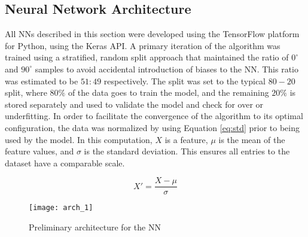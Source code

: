 \documentclass[main.tex]{subfiles}
\begin{document}
\subsection{Neural Network Architecture}\label{ssec:MLA}

All NNs described in this section were developed using the TensorFlow platform for Python, using the Keras API. A primary iteration of the algorithm was trained using a stratified, random split approach that maintained the ratio of $0^{\circ}$ and $90^{\circ}$ samples to avoid accidental introduction of biases to the NN. This ratio was estimated to be  $51:49$ respectively. The split was set to the typical $80-20$ split, where $80\%$ of the data goes to train the model, and the remaining $20\%$ is stored separately and used to validate the model and check for over or underfitting. In order to facilitate the convergence of the algorithm to its optimal configuration, the data was normalized by using Equation \ref{eq:std} prior to being used by the model. In this computation, $X$ is a feature, $\mu$ is the mean of the feature values, and $\sigma$ is the standard deviation. This ensures all entries to the dataset have a comparable scale.

\begin{equation} \label{eq:std}
	X' = \frac{X-\mu}{\sigma}
\end{equation} 



\begin{figure}[h]
	\center
	\texttt{[image: arch\_1]}
	\caption{Preliminary architecture for the NN} \label{fig:arch1}
\end{figure}


% 
%
%
%
%
%
%
%

\end{document}
